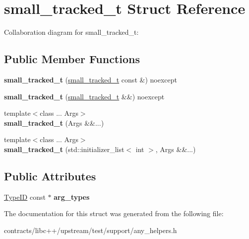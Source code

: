 \hypertarget{structsmall__tracked__t}{}\section{small\+\_\+tracked\+\_\+t Struct Reference}
\label{structsmall__tracked__t}


Collaboration diagram for small\+\_\+tracked\+\_\+t\+:
\subsection*{Public Member Functions}
\begin{DoxyCompactItemize}
\item 
\mbox{\label{structsmall__tracked__t_a725dba5382294c9363f17f4fe560ee3f}} 
{\bfseries small\+\_\+tracked\+\_\+t} (\mbox{\hyperlink{structsmall__tracked__t}{small\+\_\+tracked\+\_\+t}} const \&) noexcept
\item 
\mbox{\label{structsmall__tracked__t_a2cda4dff2a88f4886485090a5ee1c742}} 
{\bfseries small\+\_\+tracked\+\_\+t} (\mbox{\hyperlink{structsmall__tracked__t}{small\+\_\+tracked\+\_\+t}} \&\&) noexcept
\item 
\mbox{\label{structsmall__tracked__t_a4de4ece79ff56c0312c1c6a5eba01a44}} 
{\footnotesize template$<$class ... Args$>$ }\\{\bfseries small\+\_\+tracked\+\_\+t} (Args \&\&...)
\item 
\mbox{\label{structsmall__tracked__t_a3af82a75dee28d160bc5ea8020accb2a}} 
{\footnotesize template$<$class ... Args$>$ }\\{\bfseries small\+\_\+tracked\+\_\+t} (std\+::initializer\+\_\+list$<$ int $>$, Args \&\&...)
\end{DoxyCompactItemize}
\subsection*{Public Attributes}
\begin{DoxyCompactItemize}
\item 
\mbox{\label{structsmall__tracked__t_a252435de11cb46c36e276bcd80458da7}} 
\mbox{\hyperlink{struct_type_i_d}{Type\+ID}} const  $\ast$ {\bfseries arg\+\_\+types}
\end{DoxyCompactItemize}


The documentation for this struct was generated from the following file\+:\begin{DoxyCompactItemize}
\item 
contracts/libc++/upstream/test/support/any\+\_\+helpers.\+h\end{DoxyCompactItemize}
